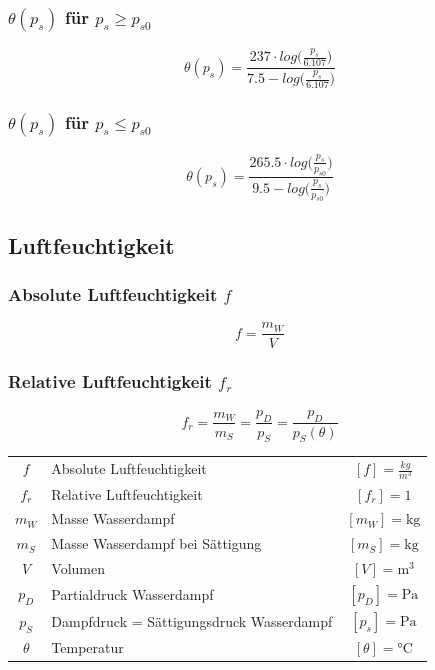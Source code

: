\subsubsection{$\theta(p_s)$ für $p_s \geq p_{s0}$}


$$ \boxed{ \theta(p_s) = \frac{237 \cdot log \big( \frac{p_s}{6.107} \big)  }{7.5 - log \big( \frac{p_s}{6.107} \big)} } $$



\subsubsection{$\theta(p_s)$ für $p_s \leq p_{s0}$}

$$ \boxed{ \theta(p_s) = \frac{265.5 \cdot log \big( \frac{p_s}{p_{s0}} \big)  }{9.5 - log \big( \frac{p_s}{p_{s0}} \big)} } $$




\subsection{Luftfeuchtigkeit}

\subsubsection{Absolute Luftfeuchtigkeit  $f$}

$$ \boxed{ f = \frac{m_W}{V}  } $$



\subsubsection{Relative Luftfeuchtigkeit $f_r$}

$$ \boxed{ f_r = \frac{m_W}{m_S} = \frac{p_D}{p_S} = \frac{p_D}{p_S(\theta)}  } $$



\begin{tabular}{c l c}
	$f$ & Absolute Luftfeuchtigkeit & $[f] = \frac{kg}{m^3}$ \\
	$f_r$ & Relative Luftfeuchtigkeit & $[f_r] = 1$ \\
	$m_W$ & Masse Wasserdampf & $[m_W] = \mathrm{kg}$ \\
	$m_S$ & Masse Wasserdampf bei Sättigung & $[m_S] = \mathrm{kg}$ \\
	$V$ & Volumen & $[V] = \mathrm{m^3}$ \\
	$p_D$ & Partialdruck Wasserdampf & $[p_D] = \mathrm{Pa}$ \\
	$p_S$ & Dampfdruck = Sättigungsdruck Wasserdampf & $[p_s] = \mathrm{Pa}$ \\
	$\theta$ & Temperatur & $[\theta] = \text{°C}$ \\
\end{tabular}


